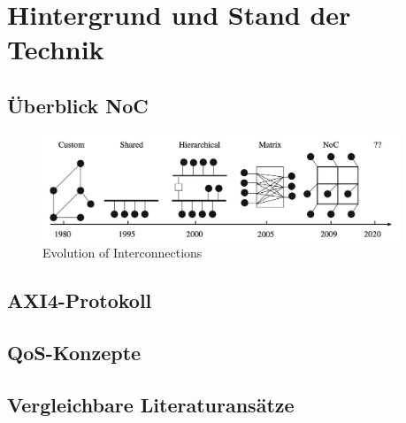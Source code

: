 \chapter{Hintergrund und Stand der Technik}

\section{Überblick NoC}
\begin{figure}[htbp]
    \centering
    \includegraphics[width=0.95\textwidth]{img/Evolution of On-Chip communication interconnect.png}
    \caption{Evolution of Interconnections~\cite{BenAbdallah2013}}  \label{fig:Evolution_of_Interconnection}
\end{figure}

\section{AXI4-Protokoll}

\section{QoS-Konzepte}

\section{Vergleichbare Literaturansätze}
